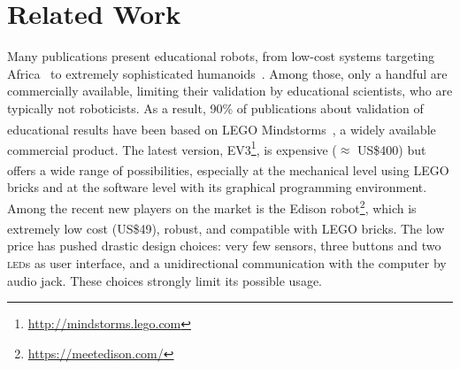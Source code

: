 \documentclass[letterpaper, 10 pt, conference]{ieeeconf}  %
\begin{document}
\section{Related Work}

Many publications present educational robots, from low-cost systems targeting Africa~\cite{Rubenstein2015,Gyebi2015} to extremely sophisticated humanoids~\cite{Hood2015,Mazzoni2016}. 
Among those, only a handful are commercially available, limiting their validation by educational scientists, who are typically not roboticists.
As a result, 90\% of publications about validation of educational results have been based on LEGO\textsuperscript{\textregistered} Mindstorms\textsuperscript{\textregistered}~\cite{benitti2012exploring}, a widely available commercial product.
The latest version, EV3\footnote{\url{http://mindstorms.lego.com}}, is expensive ($\approx$ US\$400) but offers a wide range of possibilities, especially at the mechanical level using LEGO\textsuperscript{\textregistered} bricks and at the software level with its graphical programming environment. 
Among the recent new players on the market is the Edison robot\footnote{\url{https://meetedison.com/}}, which is extremely low cost (US\$49), robust, and compatible with LEGO\textsuperscript{\textregistered} bricks. 
The low price has pushed drastic design choices: very few sensors, three buttons and two \textsc{led}s as user interface, and a unidirectional communication with the computer by audio jack.
These choices strongly limit its possible usage.
\end{document}
